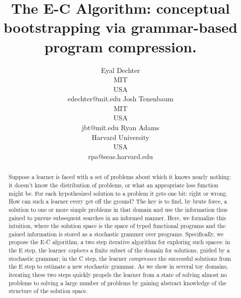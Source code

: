 \documentclass{article}
\title{The E-C Algorithm: conceptual bootstrapping via grammar-based
  program compression.}
\author{Eyal Dechter \\
MIT\\
USA \\
edechter@mit.edu
\And
Josh Tenenbaum \\
MIT\\
USA \\
jbt@mit.edu
\And 
Ryan Adams \\
Harvard University\\
USA \\
rpa@seas.harvard.edu}
\begin{document}
\maketitle

\begin{abstract}
Suppose a learner is faced with a set of problems about which it knows
nearly nothing: it doesn't know the distribution of problems, or what
an appropriate loss function might be. For each hypothesized solution
to a problem it gets one bit: right or wrong. How can such a learner
every get off the ground? The key is to find, by brute force, a
solution to one or more simple problems in that domain and use the
information thus gained to pursue subsequent searches in an informed
manner. Here, we formalize this intuition, where the solution space is
the space of typed functional programs and the gained information is
stored as a stochastic grammer over programs. Specifically, we propose
the E-C algorithm, a two step iterative algorithm for exploring such
spaces: in the E step, the learner \emph{explores} a finite subset of
the domain for solutions, guided by a stochastic grammar; in the C
step, the learner \emph{compresses} the successful solutions from the
E step to estimate a new stochastic grammar. As we show in several toy
domains, iterating these two steps quickly propels the learner from a
state of solving almost no problems to solving a large number of
problems by gaining abstract knowledge of the structure of the
solution space.
\end{abstract}
\end{document}
